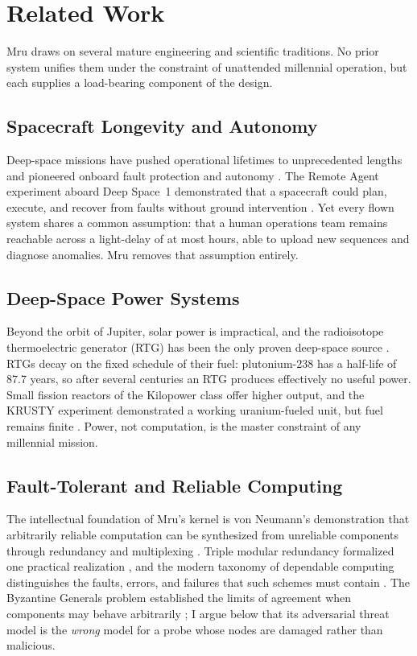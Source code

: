 \documentclass[10pt, a4paper]{article}
\begin{document}
\section{Related Work}

Mru draws on several mature engineering and scientific traditions. No prior system unifies them under the constraint of unattended millennial operation, but each supplies a load-bearing component of the design.

\subsection{Spacecraft Longevity and Autonomy}

Deep-space missions have pushed operational lifetimes to unprecedented lengths and pioneered onboard fault protection and autonomy \cite{kohlhase1977}. The Remote Agent experiment aboard Deep Space~1 demonstrated that a spacecraft could plan, execute, and recover from faults without ground intervention \cite{muscettola1998}. Yet every flown system shares a common assumption: that a human operations team remains reachable across a light-delay of at most hours, able to upload new sequences and diagnose anomalies. Mru removes that assumption entirely.

\subsection{Deep-Space Power Systems}

Beyond the orbit of Jupiter, solar power is impractical, and the radioisotope thermoelectric generator (RTG) has been the only proven deep-space source \cite{bennett2006}. RTGs decay on the fixed schedule of their fuel: plutonium-238 has a half-life of 87.7 years, so after several centuries an RTG produces effectively no useful power. Small fission reactors of the Kilopower class offer higher output, and the KRUSTY experiment demonstrated a working uranium-fueled unit, but fuel remains finite \cite{gibson2017, poston2020}. Power, not computation, is the master constraint of any millennial mission.

\subsection{Fault-Tolerant and Reliable Computing}

The intellectual foundation of Mru's kernel is von Neumann's demonstration that arbitrarily reliable computation can be synthesized from unreliable components through redundancy and multiplexing \cite{vonneumann1956}. Triple modular redundancy formalized one practical realization \cite{lyons1962}, and the modern taxonomy of dependable computing distinguishes the faults, errors, and failures that such schemes must contain \cite{avizienis2004}. The Byzantine Generals problem established the limits of agreement when components may behave arbitrarily \cite{lamport1982}; I argue below that its adversarial threat model is the \textit{wrong} model for a probe whose nodes are damaged rather than malicious.
\end{document}

